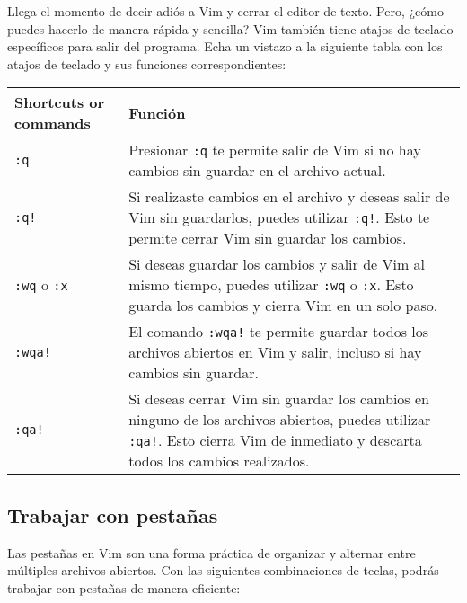 \documentclass[
  doc,
  floatsintext,
  longtable,
  a4paper,
  nolmodern,
  notxfonts,
  notimes,
  colorlinks=true,linkcolor=blue,citecolor=blue,urlcolor=blue]{apa7}
\begin{document}
Llega el momento de decir adiós a Vim y cerrar el editor de texto. Pero,
¿cómo puedes hacerlo de manera rápida y sencilla? Vim también tiene
atajos de teclado específicos para salir del programa. Echa un vistazo a
la siguiente tabla con los atajos de teclado y sus funciones
correspondientes:

\begin{longtable}[]{@{}
  >{\raggedright\arraybackslash}p{}
  >{\raggedright\arraybackslash}p{}@{}}
\toprule\noalign{}
\begin{minipage}[b]{\linewidth}\raggedright
Shortcuts or commands
\end{minipage} & \begin{minipage}[b]{\linewidth}\raggedright
Función
\end{minipage} \\
\midrule\noalign{}
\endhead
\bottomrule\noalign{}
\endlastfoot
\texttt{:q} & Presionar \texttt{:q} te permite salir de Vim si no hay
cambios sin guardar en el archivo actual. \\
\texttt{:q!} & Si realizaste cambios en el archivo y deseas salir de Vim
sin guardarlos, puedes utilizar \texttt{:q!}. Esto te permite cerrar Vim
sin guardar los cambios. \\
\texttt{:wq} o \texttt{:x} & Si deseas guardar los cambios y salir de
Vim al mismo tiempo, puedes utilizar \texttt{:wq} o \texttt{:x}. Esto
guarda los cambios y cierra Vim en un solo paso. \\
\texttt{:wqa!} & El comando \texttt{:wqa!} te permite guardar todos los
archivos abiertos en Vim y salir, incluso si hay cambios sin guardar. \\
\texttt{:qa!} & Si deseas cerrar Vim sin guardar los cambios en ninguno
de los archivos abiertos, puedes utilizar \texttt{:qa!}. Esto cierra Vim
de inmediato y descarta todos los cambios realizados. \\
\end{longtable}

\subsection{Trabajar con pestañas}\label{trabajar-con-pestauxf1as}

Las pestañas en Vim son una forma práctica de organizar y alternar entre
múltiples archivos abiertos. Con las siguientes combinaciones de teclas,
podrás trabajar con pestañas de manera eficiente:
\end{document}
